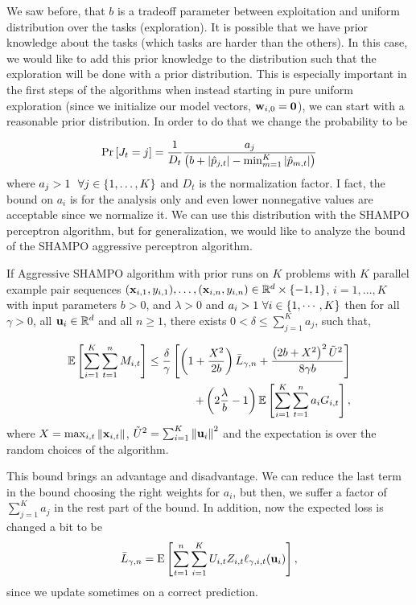 {We saw before, that $b$ is a tradeoff parameter between  exploitation and uniform  distribution over the 
tasks (exploration). It is possible that we have prior knowledge about the tasks (which tasks are harder than 
the others). In this case, we would like to add this prior knowledge to the distribution such that the 
exploration will be done with a prior distribution. This is especially important in the first steps of the 
algorithms when instead starting in pure uniform exploration (since we initialize our model vectors, $\mathbf{w}_{i,0}={\boldsymbol{0}}$),  
we can start with a reasonable prior distribution.
In order to do that we change the probability to be 

\begin{equation*}
{\rm Pr}\left[{J_t=j}\right] =
\frac{1}{D_{t}}\frac{a_{j}}{\left({b+\left\vert{\hat{p}_{j,t}}\right\vert-\min_{m=1}^K\left\vert{\hat{p}_{m,t}}\right\vert}\right)} \end{equation*}
where $a_j>1~~\forall j\in\left\{{1,\ldots,K}\right\}$ and  $D_t$ is the normalization factor. 
I fact, the bound on $a_i$ is for the analysis only and even lower nonnegative 
values are acceptable since we normalize it.
We can use this distribution with the SHAMPO perceptron algorithm, but for generalization, we would like to analyze the 
bound of the SHAMPO aggressive perceptron algorithm. 

\begin{theorem}
  If Aggressive SHAMPO algorithm with prior runs on $K$ problems with $K$ parallel example pair
  sequences
  $(\mathbf{x}_{i,1},y_{i,1}),\ldots,(\mathbf{x}_{i,n},y_{i,n})\in\mathbb{R}^d\times\{-1,1\}$,
  $i=1,...,K$ with input parameters $b>0$, and $\lambda>0$  and $a_i>1~\forall i\in\left\{{1,\cdots,K}\right\}$ then for all $\gamma>0$, all
  $\mathbf{u}_{i}\in\mathbb{R}^d$ and all $n\ge1$, there exists $0<\delta\le \sum_{j=1}^Ka_{j}$, such that,
  
\begin{displaymath}
\begin{split}
\mathbb{E}\left[ \sum_{i=1}^{K}\sum_{t=1}^{n}{M_{i,t}} \right]
\le\frac{\delta}{\gamma}\left[{\left(1+\frac{X^2}{2b} \right){\bar L}_{\gamma,n}+
\frac{\left({2b+X^2}\right)^2\tilde{U}^2}{8{\gamma}b}}\right]\\ 
+
\left({2\frac{\lambda}{b}-1}\right)\mathbb{E}\left[{\sum_{i=1}^{K}\sum_{t=1}^{n}{a_{i}G_{i,t}}}\right],
\label{bound_FO_SHAMPO_prior}
\end{split}
\end{displaymath}
 where $X=\max_{i,t}\Vert\mathbf{x}_{i,t}\Vert$,
$\tilde{U}^2=\sum_{i=1}^{K}\left\Vert {\mathbf{u}_{i}} \right\Vert^2$ and the expectation is over the
random choices of the algorithm.
\label{thm:FO_bound_aggressive_prior}
\end{theorem} 
This bound brings an advantage and disadvantage. We can reduce the last term in the bound choosing
 the right weights for $a_i$, but then, we suffer a factor of $\sum_{j=1}^Ka_{j}$ in the rest part of the bound. In 
 addition, now the expected loss is changed a bit to be 
 \begin{equation*}
\bar{L}_{\gamma,n}={\rm E}\left[{\sum_{t=1}^n \sum_{i=1}^{K}{U_{i,t}Z_{i,t}\ell_{\gamma,i,t}(\mathbf{u}_{i})}}\right],
 \end{equation*}
 since we update sometimes on a correct prediction.  
\\

}
